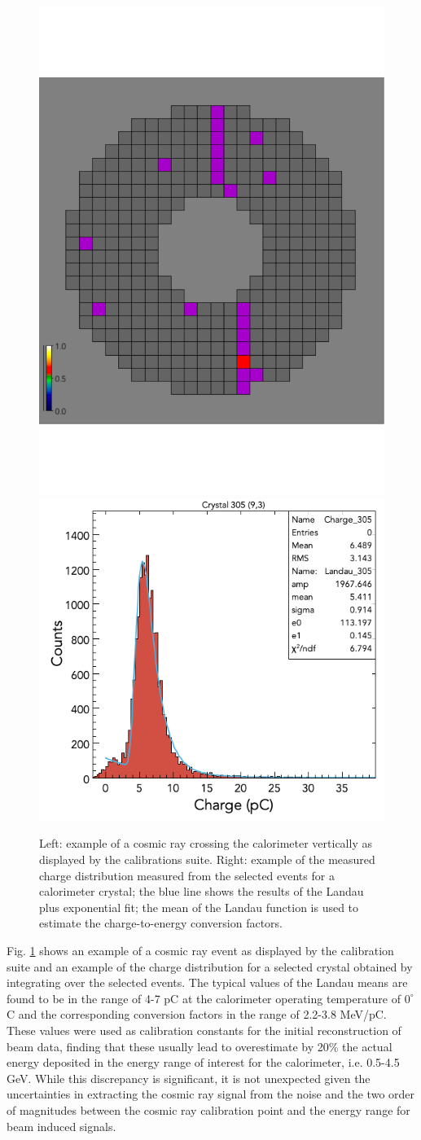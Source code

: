 \begin{figure}
\includegraphics[height=0.58\columnwidth]{fig/ftcal_cosmicview.pdf}
\includegraphics[height=0.5\columnwidth]{fig/ftcal_cosmiccharge.png}
\caption{Left: example of a cosmic ray crossing the calorimeter vertically as displayed by the calibrations suite. Right: example of the measured charge distribution measured from the selected events for a calorimeter crystal; the blue line shows the results of the Landau plus exponential fit; the mean of the Landau function is used to estimate the charge-to-energy conversion factors.}
\label{fig:ftcal_cosmic}
\end{figure}
Fig. \ref{fig:ftcal_cosmic} shows an example of a cosmic ray event as displayed by the calibration suite and an example of the charge distribution for a selected crystal obtained by integrating over the selected events. The typical values of the Landau means are found to be in the range of 4-7 pC at the calorimeter operating temperature of $0^\circ$ C and the corresponding conversion factors in the range of 2.2-3.8 MeV/pC. These values were used as calibration constants for the initial reconstruction of beam data, finding that these usually lead to overestimate by 20\% the actual energy deposited in the energy range of interest for the calorimeter, i.e. 0.5-4.5 GeV. While this discrepancy is significant, it is not unexpected given the uncertainties in extracting the cosmic ray signal from the noise and the two order of magnitudes between the cosmic ray calibration point and the energy range for beam induced signals.

